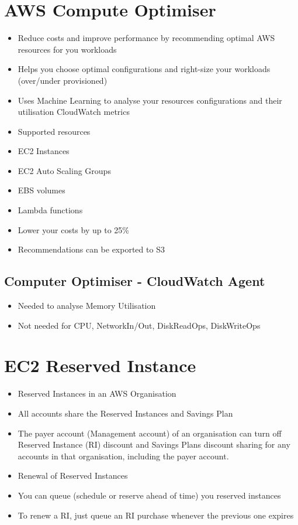 \section{AWS Compute Optimiser}
\begin{itemize}
    \item Reduce costs and improve performance by recommending optimal AWS resources for you workloads
    \item Helps you choose optimal configurations and right-size your workloads (over/under provisioned)
    \item Uses Machine Learning to analyse your resources configurations and their utilisation CloudWatch metrics
    \item Supported resources
    \item EC2 Instances
    \item EC2 Auto Scaling Groups
    \item EBS volumes
    \item Lambda functions
    \item Lower your costs by up to 25\%
    \item Recommendations can be exported to S3
\end{itemize}

\subsection{Computer Optimiser - CloudWatch Agent}
\begin{itemize}
    \item Needed to analyse Memory Utilisation
    \item Not needed for CPU, NetworkIn/Out, DiskReadOps, DiskWriteOps
\end{itemize}


\section{EC2 Reserved Instance}
\begin{itemize}
    \item Reserved Instances in an AWS Organisation
    \item All accounts share the Reserved Instances and Savings Plan
    \item The payer account (Management account) of an organisation can turn off Reserved Instance (RI) discount and Savings Plans discount sharing for any accounts in that organisation, including the payer account.
    \item Renewal of Reserved Instances
    \item You can queue (schedule or reserve ahead of time) you reserved instances
    \item To renew a RI, just queue an RI purchase whenever the previous one expires
\end{itemize}